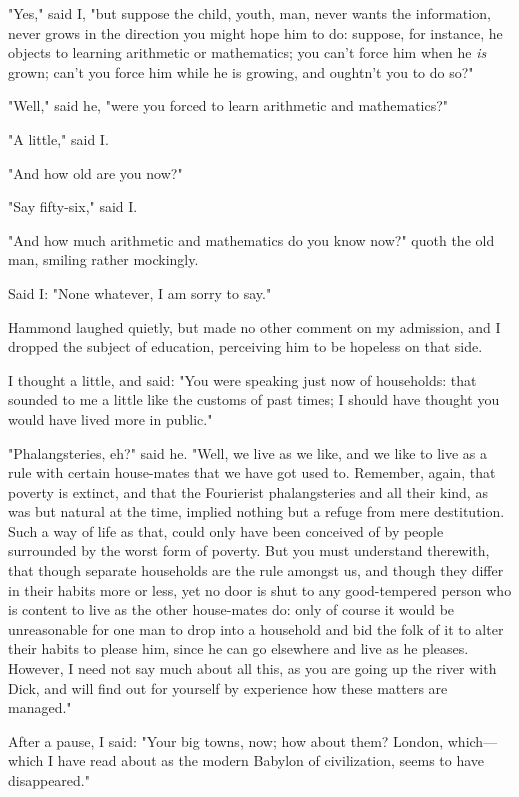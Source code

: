 "Yes," said I, "but suppose the child, youth, man, never wants the
information, never grows in the direction you might hope him to do:
suppose, for instance, he objects to learning arithmetic or mathematics;
you can't force him when he \emph{is} grown; can't you force him while
he is growing, and oughtn't you to do so?"

"Well," said he, "were you forced to learn arithmetic and mathematics?"

"A little," said I.

"And how old are you now?"

"Say fifty-six," said I.

"And how much arithmetic and mathematics do you know now?" quoth the old
man, smiling rather mockingly.

Said I: "None whatever, I am sorry to say."

Hammond laughed quietly, but made no other comment on my admission, and
I dropped the subject of education, perceiving him to be hopeless on
that side.

I thought a little, and said: "You were speaking just now of households:
that sounded to me a little like the customs of past times; I should
have thought you would have lived more in public."

"Phalangsteries, eh?" said he. "Well, we live as we like, and we like to
live as a rule with certain house-mates that we have got used to.
Remember, again, that poverty is extinct, and that the Fourierist
phalangsteries and all their kind, as was but natural at the time,
implied nothing but a refuge from mere destitution. Such a way of life
as that, could only have been conceived of by people surrounded by the
worst form of poverty. But you must understand therewith, that though
separate households are the rule amongst us, and though they differ in
their habits more or less, yet no door is shut to any good-tempered
person who is content to live as the other house-mates do: only of
course it would be unreasonable for one man to drop into a household and
bid the folk of it to alter their habits to please him, since he can go
elsewhere and live as he pleases. However, I need not say much about all
this, as you are going up the river with Dick, and will find out for
yourself by experience how these matters are managed."

After a pause, I said: "Your big towns, now; how about them? London,
which---which I have read about as the modern Babylon of civilization,
seems to have disappeared."

